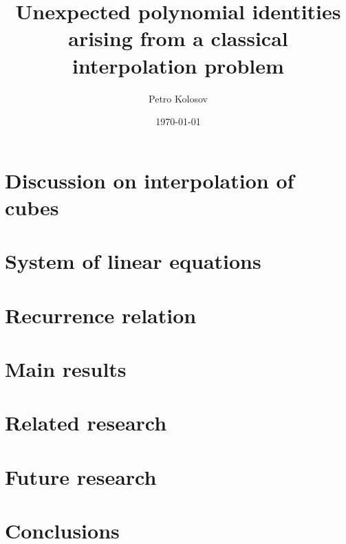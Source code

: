 \documentclass[12pt,letterpaper,oneside,reqno]{amsart}
\title[Unexpected polynomial identities arising from a class. interpolation problem]
{Unexpected polynomial identities arising from a classical interpolation problem}
\author[Petro Kolosov]{Petro Kolosov}
\date{\today}
\begin{document}
    \begin{abstract}
        
    \end{abstract}

    \maketitle

    \tableofcontents


    \section{Discussion on interpolation of cubes}
    \label{sec:the-problem-of-interpolation-of-cubes}
    


    \section{System of linear equations}
    \label{sec:system-of-linear-equations-approach}
    


    \section{Recurrence relation}
    \label{sec:recurrence-relation-approach}
    


    \section{Main results}
    \label{sec:main-results}
    


    \section{Related research}\label{sec:related-research}
    


    \section{Future research}\label{sec:future-research}
    


    \section{Conclusions}\label{sec:conclusions}
    
\end{document}
